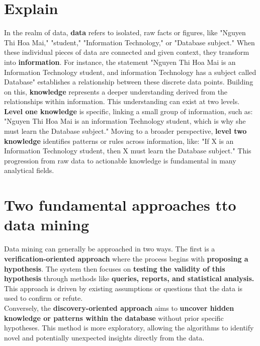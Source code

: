 \section{Explain}
In the realm of data, \textbf{data} refers to isolated, raw facts or figures, like "Nguyen Thi Hoa Mai," "student," "Information Technology," or "Database subject." When these individual pieces of data are connected and given context, they transform into \textbf{information}. For instance, the statement "Nguyen Thi Hoa Mai is an Information Technology student, and information Technology has a subject called Database" establishes a relationship between these discrete data points. Building on this, \textbf{knowledge} represents a deeper understanding derived from the relationships within information. This understanding can exist at two levels. \textbf{Level one knowledge} is specific, linking a small group of information, such as: "Nguyen Thi Hoa Mai is an information Technology student, which is why she must learn the Database subject." Moving to a broader perspective, \textbf{level two knowledge} identifies patterns or rules across information, like: "If X is an Information Technology student, then X must learn the Database subject." This progression from raw data to actionable knowledge is fundamental in many analytical fields.
\section{Two fundamental approaches tto data mining}
Data mining can generally be approached in two ways. The first is a \textbf{verification-oriented approach} where the process begins with \textbf{proposing a hypothesis}. The system then focuses on \textbf{testing the validity of this hypothesis} through methods like \textbf{queries, reports, and statistical analysis.} This approach is driven by existing assumptions or questions that the data is used to confirm or refute.\\
Conversely, the \textbf{discovery-oriented approach} aims to \textbf{uncover hidden knowledge or patterns within the database} without prior specific hypotheses. This method is more exploratory, allowing the algorithms to identify novel and potentially unexpected insights directly from the data.
